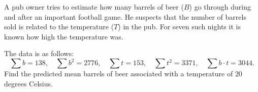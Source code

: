 A pub owner tries to estimate how many barrels of beer ($B$) go through during and after an important football game.
He suspects that the number of barrels sold is related to the temperature ($T$) in the pub.
For seven such nights it is known how high the temperature was. 

The data is as follows:
\[
 \sum b = 138, \quad  \sum b^2 = 2776, \quad \sum t = 153, \quad \sum t^2 = 3371, \quad \sum b \cdot t = 3044.
\]
Find the predicted mean barrels of beer associated with a temperature of $20$ degrees Celsius.